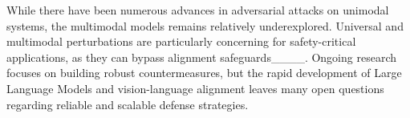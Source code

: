 While there have been numerous advances in adversarial attacks on unimodal systems, the multimodal models remains relatively underexplored. Universal and multimodal perturbations are particularly concerning for safety-critical applications, as they can bypass alignment safeguards____. Ongoing research focuses on building robust countermeasures, but the rapid development of Large Language Models and vision-language alignment leaves many open questions regarding reliable and scalable defense strategies.